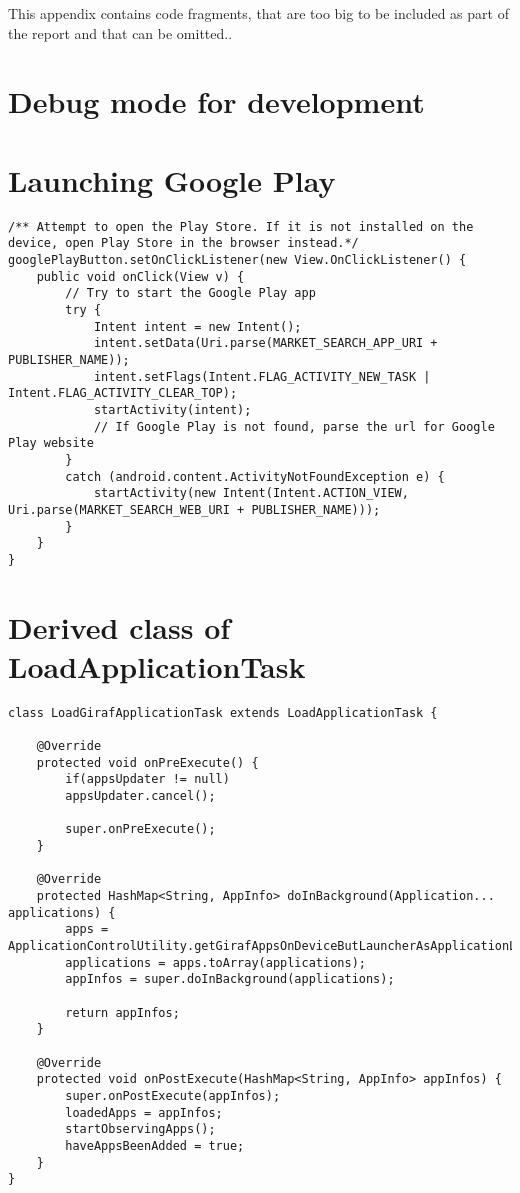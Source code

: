 This appendix contains code fragments, that are too big to be included as part of the report and that can be omitted..

\section {Debug mode for development}\label{appendix:debugmode}



\section{Launching Google Play}

\begin{lstlisting}[caption={The OnClickListener for the googlePlayButton, launching the Play Store correctly}, label={lst:launchergoogleplay}]
/** Attempt to open the Play Store. If it is not installed on the device, open Play Store in the browser instead.*/
googlePlayButton.setOnClickListener(new View.OnClickListener() {
	public void onClick(View v) {
		// Try to start the Google Play app
		try {
			Intent intent = new Intent();
			intent.setData(Uri.parse(MARKET_SEARCH_APP_URI + PUBLISHER_NAME));
			intent.setFlags(Intent.FLAG_ACTIVITY_NEW_TASK | Intent.FLAG_ACTIVITY_CLEAR_TOP);
			startActivity(intent);
			// If Google Play is not found, parse the url for Google Play website
		} 
		catch (android.content.ActivityNotFoundException e) {
			startActivity(new Intent(Intent.ACTION_VIEW, Uri.parse(MARKET_SEARCH_WEB_URI + PUBLISHER_NAME)));
		}
	}
}
\end{lstlisting}

\section{Derived class of LoadApplicationTask}

  \begin{lstlisting}[caption={The LoadGirafApplicationTask, derived from LoadApplicationTask. This is the derived class used by GirafFragment to load applications into view. Please note that all comments and the constructor have been removed to make the listing smaller}, label={lst:derivedlat}]
class LoadGirafApplicationTask extends LoadApplicationTask {
	
	@Override
	protected void onPreExecute() {
		if(appsUpdater != null)
		appsUpdater.cancel();
		
		super.onPreExecute();
	}
	
	@Override
	protected HashMap<String, AppInfo> doInBackground(Application... applications) {
		apps = ApplicationControlUtility.getGirafAppsOnDeviceButLauncherAsApplicationList(context);
		applications = apps.toArray(applications);
		appInfos = super.doInBackground(applications);
		
		return appInfos;
	}
	
	@Override
	protected void onPostExecute(HashMap<String, AppInfo> appInfos) {
		super.onPostExecute(appInfos);
		loadedApps = appInfos;
		startObservingApps();
		haveAppsBeenAdded = true;
	}
}
\end{lstlisting}

